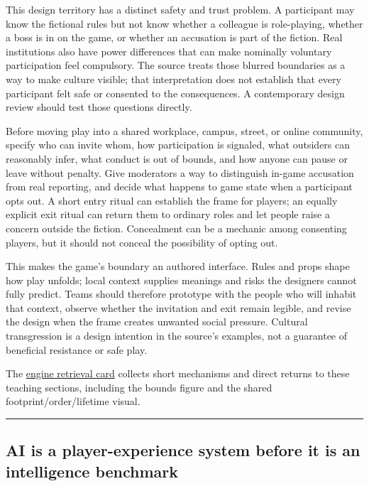 This design territory has a distinct safety and trust problem. A participant may know the fictional rules but not know whether a colleague is role-playing, whether a boss is in on the game, or whether an accusation is part of the fiction. Real institutions also have power differences that can make nominally voluntary participation feel compulsory. The source treats those blurred boundaries as a way to make culture visible; that interpretation does not establish that every participant felt safe or consented to the consequences. A contemporary design review should test those questions directly.

Before moving play into a shared workplace, campus, street, or online community, specify who can invite whom, how participation is signaled, what outsiders can reasonably infer, what conduct is out of bounds, and how anyone can pause or leave without penalty. Give moderators a way to distinguish in-game accusation from real reporting, and decide what happens to game state when a participant opts out. A short entry ritual can establish the frame for players; an equally explicit exit ritual can return them to ordinary roles and let people raise a concern outside the fiction. Concealment can be a mechanic among consenting players, but it should not conceal the possibility of opting out.

This makes the game's boundary an authored interface. Rules and props shape how play unfolds; local context supplies meanings and risks the designers cannot fully predict. Teams should therefore prototype with the people who will inhabit that context, observe whether the invitation and exit remain legible, and revise the design when the frame creates unwanted social pressure. Cultural transgression is a design intention in the source's examples, not a guarantee of beneficial resistance or safe play.

The \hyperref[appendix-64ea716dcadc]{engine retrieval card} collects short mechanisms and direct returns to these teaching sections, including the bounds figure and the shared footprint/order/lifetime visual.

\begin{center}\rule{0.5\linewidth}{0.5pt}\end{center}

\subsection{AI is a player-experience system before it is an intelligence benchmark}\label{ai-is-a-player-experience-system-before-it-is-an-intelligence-benchmark}


